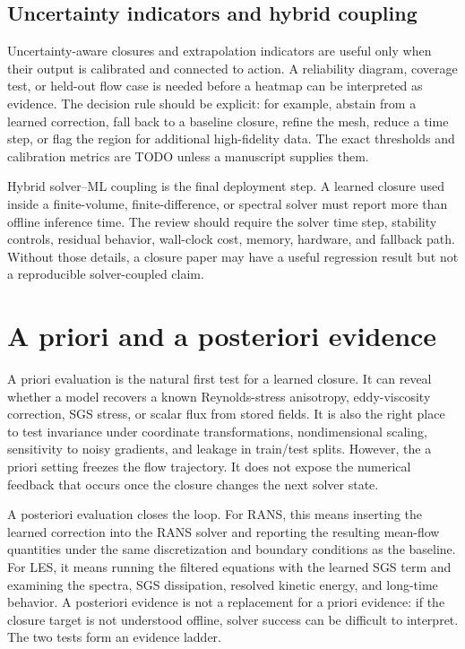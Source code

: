 \documentclass[11pt]{article}
\begin{document}
\subsection{Uncertainty indicators and hybrid coupling}

Uncertainty-aware closures and extrapolation indicators are useful only when their output is calibrated and connected to action. A reliability diagram, coverage test, or held-out flow case is needed before a heatmap can be interpreted as evidence. The decision rule should be explicit: for example, abstain from a learned correction, fall back to a baseline closure, refine the mesh, reduce a time step, or flag the region for additional high-fidelity data. The exact thresholds and calibration metrics are TODO unless a manuscript supplies them.

Hybrid solver--ML coupling is the final deployment step. A learned closure used inside a finite-volume, finite-difference, or spectral solver must report more than offline inference time. The review should require the solver time step, stability controls, residual behavior, wall-clock cost, memory, hardware, and fallback path. Without those details, a closure paper may have a useful regression result but not a reproducible solver-coupled claim.

\section{A priori and a posteriori evidence}

A priori evaluation is the natural first test for a learned closure. It can reveal whether a model recovers a known Reynolds-stress anisotropy, eddy-viscosity correction, SGS stress, or scalar flux from stored fields. It is also the right place to test invariance under coordinate transformations, nondimensional scaling, sensitivity to noisy gradients, and leakage in train/test splits. However, the a priori setting freezes the flow trajectory. It does not expose the numerical feedback that occurs once the closure changes the next solver state.

A posteriori evaluation closes the loop. For RANS, this means inserting the learned correction into the RANS solver and reporting the resulting mean-flow quantities under the same discretization and boundary conditions as the baseline. For LES, it means running the filtered equations with the learned SGS term and examining the spectra, SGS dissipation, resolved kinetic energy, and long-time behavior. A posteriori evidence is not a replacement for a priori evidence: if the closure target is not understood offline, solver success can be difficult to interpret. The two tests form an evidence ladder.
\end{document}
